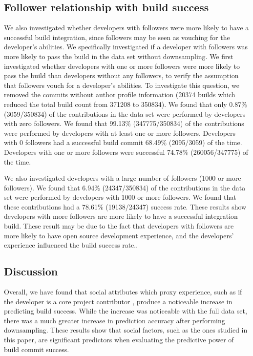 \documentclass[10pt, conference]{IEEEtran}
\begin{document}
\subsection{Follower relationship with build success}
\label{sec:followerSuccess}

We also investigated whether developers with followers were more likely to have a
successful build integration, since followers may be seen as vouching for
the developer's abilities.  We specifically investigated if a developer with 
followers was more likely to pass the build in the data set without 
downsampling.  We first investigated whether developers with one or more followers
were more likely to pass the build than developers without any followers, to
verify the assumption that followers vouch for a developer's abilities. To
investigate this question, we removed the commits without author profile
information (20374 builds which reduced the total build count from 371208 to
350834). We found 
that only 0.87\% (3059/350834) of the
contributions in the data set were performed by developers with zero 
followers. We found that 99.13\% (347775/350834) of the contributions 
were performed by
developers with at least one or more followers.
Developers with 0 followers had a successful build commit 68.49\% (2095/3059)
of the time.  Developers with one or more followers were successful 74.78\%
(260056/347775) of the time.

We also investigated developers with a large number of followers (1000 or more
followers).  We found that 6.94\% (24347/350834) of the contributions in the 
data set were
performed by developers with 1000 or more followers.  We found that these
contributions had a 78.61\% (19138/24347) success rate.  These results show 
developers
with more followers are more likely to have a successful integration build.
These
result may be due to the fact that developers with followers are more likely to
have open source development experience, and the developers' experience
influenced the build success rate.. 

\subsection{Discussion}

Overall, we have found that social attributes which proxy experience, such as if
the developer is a core project contributor , produce a 
noticeable increase in predicting build success.  While the increase was noticeable 
with the full data set, there was a much greater increase in prediction
accuracy after performing downsampling. These results show that social factors,
such 
as the ones studied in this paper, are significant predictors when
evaluating the predictive power of build commit success.
\end{document}

